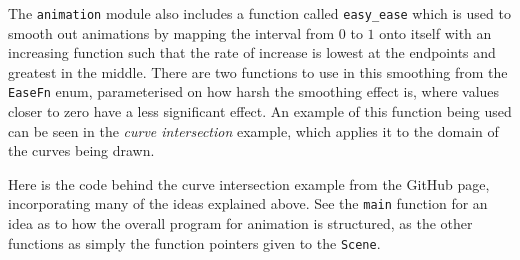 The \verb|animation| module also includes a function called \verb|easy_ease| which is used to smooth out animations by mapping the interval from $0$ to $1$ onto itself with an increasing function such that the rate of increase is lowest at the endpoints and greatest in the middle. There are two functions to use in this smoothing from the \verb|EaseFn| enum, parameterised on how harsh the smoothing effect is, where values closer to zero have a less significant effect. An example of this function being used can be seen in the \emph{curve intersection} example, which applies it to the domain of the curves being drawn.

Here is the code behind the curve intersection example from the GitHub page, incorporating many of the ideas explained above. See the \verb|main| function for an idea as to how the overall program for animation is structured, as the other functions as simply the function pointers given to the \verb|Scene|.

